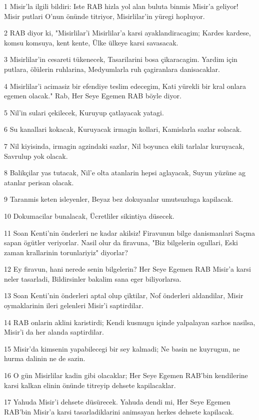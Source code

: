 \par 1 Misir'la ilgili bildiri: Iste RAB hizla yol alan buluta binmis Misir'a geliyor! Misir putlari O'nun önünde titriyor, Misirlilar'in yüregi hopluyor.
\par 2 RAB diyor ki, "Misirlilar'i Misirlilar'a karsi ayaklandiracagim; Kardes kardese, komsu komsuya, kent kente, Ülke ülkeye karsi savasacak.
\par 3 Misirlilar'in cesareti tükenecek, Tasarilarini bosa çikaracagim. Yardim için putlara, ölülerin ruhlarina, Medyumlarla ruh çagiranlara danisacaklar.
\par 4 Misirlilar'i acimasiz bir efendiye teslim edecegim, Kati yürekli bir kral onlara egemen olacak." Rab, Her Seye Egemen RAB böyle diyor.
\par 5 Nil'in sulari çekilecek, Kuruyup çatlayacak yatagi.
\par 6 Su kanallari kokacak, Kuruyacak irmagin kollari, Kamislarla sazlar solacak.
\par 7 Nil kiyisinda, irmagin agzindaki sazlar, Nil boyunca ekili tarlalar kuruyacak, Savrulup yok olacak.
\par 8 Balikçilar yas tutacak, Nil'e olta atanlarin hepsi aglayacak, Suyun yüzüne ag atanlar perisan olacak.
\par 9 Taranmis keten isleyenler, Beyaz bez dokuyanlar umutsuzluga kapilacak.
\par 10 Dokumacilar bunalacak, Ücretliler sikintiya düsecek.
\par 11 Soan Kenti'nin önderleri ne kadar akilsiz! Firavunun bilge danismanlari Saçma sapan ögütler veriyorlar. Nasil olur da firavuna, "Biz bilgelerin ogullari, Eski zaman krallarinin torunlariyiz" diyorlar?
\par 12 Ey firavun, hani nerede senin bilgelerin? Her Seye Egemen RAB Misir'a karsi neler tasarladi, Bildirsinler bakalim sana eger biliyorlarsa.
\par 13 Soan Kenti'nin önderleri aptal olup çiktilar, Nof önderleri aldandilar, Misir oymaklarinin ileri gelenleri Misir'i saptirdilar.
\par 14 RAB onlarin aklini karistirdi; Kendi kusmugu içinde yalpalayan sarhos nasilsa, Misir'i da her alanda saptirdilar.
\par 15 Misir'da kimsenin yapabilecegi bir sey kalmadi; Ne basin ne kuyrugun, ne hurma dalinin ne de sazin.
\par 16 O gün Misirlilar kadin gibi olacaklar; Her Seye Egemen RAB'bin kendilerine karsi kalkan elinin önünde titreyip dehsete kapilacaklar.
\par 17 Yahuda Misir'i dehsete düsürecek. Yahuda dendi mi, Her Seye Egemen RAB'bin Misir'a karsi tasarladiklarini animsayan herkes dehsete kapilacak.
